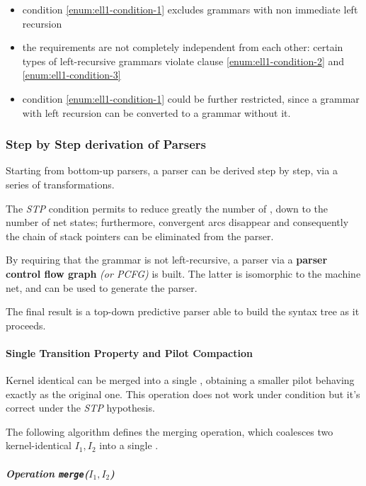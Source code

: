 \documentclass[english]{article}
\begin{document}
\begin{itemize}
  \item condition \ref{enum:ell1-condition-1} excludes grammars with non immediate left recursion
  \item the requirements are not completely independent from each other: certain types of left-recursive grammars violate clause \ref{enum:ell1-condition-2} and \ref{enum:ell1-condition-3}
  \item condition \ref{enum:ell1-condition-1} could be further restricted, since a grammar with left recursion can be converted to a grammar without it.
\end{itemize}

\subsubsection[Step by Step derivation of ELL(1) Parsers]{Step by Step derivation of \ello Parsers}

Starting from bottom-up parsers, a \ello parser can be derived step by step, via a series of transformations.

The \textit{STP} condition permits to reduce greatly the number of \mstates, down to the number of net states;
furthermore, convergent arcs disappear and consequently the chain of stack pointers can be eliminated from the parser.

By requiring that the grammar is not left-recursive, a parser via a \textbf{parser control flow graph} \textit{(or PCFG)} is built.
The latter is isomorphic to the machine net, and can be used to generate the parser.

The final result is a top-down predictive parser able to build the syntax tree as it proceeds.

\paragraph{Single Transition Property and Pilot Compaction}

Kernel identical \mstates can be merged into a single \mstate, obtaining a smaller pilot behaving exactly as the original one.
This operation does not work under \elro condition but it's correct under the \textit{STP} hypothesis.

The following algorithm defines the merging operation, which coalesces two kernel-identical \mstates \(I_1, I_2\) into a single \mstate.

\subparagraph*{Operation \texttt{merge}(\(I_1, I_2\))}
\end{document}

